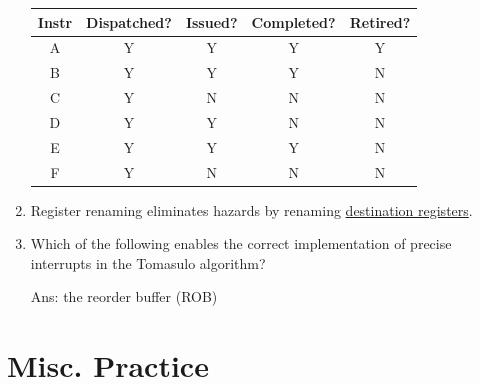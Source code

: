 \documentclass[12pt]{article}
\begin{document}
\begin{enumerate}
        \begin{table}[ht!]
            \centering
            \begin{tabular}{|c|c|c|c|c|}
                \hline
                Instr & Dispatched? & Issued? & Completed? & Retired? \\ \hline
                A     & Y           & Y       & Y          & Y        \\ \hline
                B     & Y           & Y       & Y          & N        \\ \hline
                C     & Y           & N       & N          & N        \\ \hline
                D     & Y           & Y       & N          & N        \\ \hline
                E     & Y           & Y       & Y          & N        \\ \hline
                F     & Y           & N       & N          & N        \\ \hline
            \end{tabular}
        \end{table}

        \item Register renaming eliminates hazards by renaming \underline{destination registers}.
        \item Which of the following enables the correct implementation of precise interrupts in the Tomasulo algorithm?
        
        Ans: the reorder buffer (ROB)
    \end{enumerate}

    \section{Misc. Practice}
\end{document}
